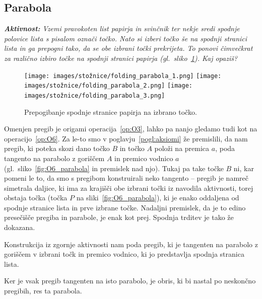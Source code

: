 \subsection{Parabola}

\textit{\textbf{Aktivnost:} Vzemi pravokoten list papirja in svinčnik ter nekje sredi spodnje polovice lista s pisalom označi točko. Nato si izberi točko še na spodnji stranici lista in ga prepogni tako, da se obe izbrani točki prekrijeta. To ponovi čimvečkrat za različno izbiro točke na spodnji stranici papirja (gl.\ sliko~\ref{fig:koraki_parabola}). Kaj opaziš?}

\begin{figure}[h]
    \centering
    \texttt{[image: images/stožnice/folding\_parabola\_1.png]}
    \texttt{[image: images/stožnice/folding\_parabola\_2.png]}
    \texttt{[image: images/stožnice/folding\_parabola\_3.png]}
    \caption[Prepogibanje parabole]{Prepogibanje spodnje stranice papirja na izbrano točko.}
    \label{fig:koraki_parabola}
\end{figure}


Omenjen pregib je origami operacija~\ref{op:O3}, lahko pa nanjo gledamo tudi kot na operacijo~\ref{op:O6}. Za le-to smo v poglavju~\ref{pogl:aksiomi} že premislili, da nam pregib, ki poteka skozi dano točko $B$ in točko $A$ položi na premica $a$, poda tangento na parabolo z goriščem $A$ in premico vodnico $a$ (gl.\ sliko~\ref{fig:O6_parabola} in premislek nad njo). Tukaj pa take točke $B$ ni, kar pomeni le to, da smo s pregibom konstruirali neko tangento -- pregib je namreč simetrala daljice, ki ima za krajišči obe izbrani točki iz navodila aktivnosti, torej obstaja točka (točka $P$ na sliki~\ref{fig:O6_parabola}), ki je enako oddaljena od spodnje stranice lista in prve izbrane točke. Nadaljni premislek, da je to edino presečišče pregiba in parabole, je enak kot prej. Spodnja trditev je tako že dokazana.

\begin{trditev}
    Konstrukcija iz zgornje aktivnosti nam poda pregib, ki je tangenten na parabolo z goriščem v izbrani točk in premico vodnico, ki jo predstavlja spodnja stranica lista.
\end{trditev}

Ker je vsak pregib tangenten na isto parabolo, je obris, ki bi nastal po neskončno pregibih, res ta parabola.

